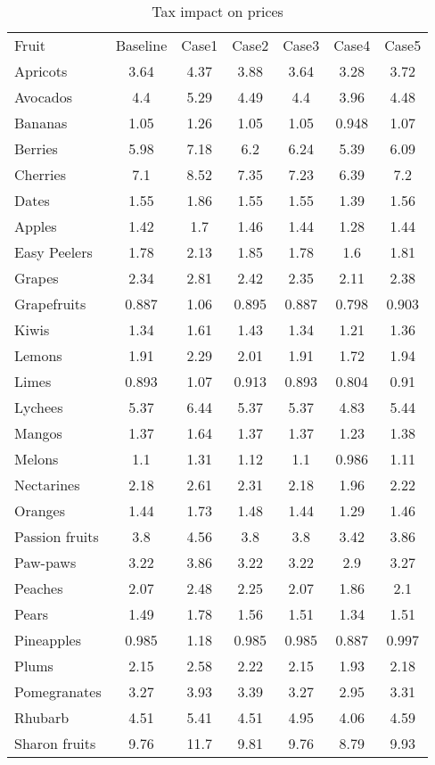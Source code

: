 \documentclass[11pt]{article}
\begin{document}
\begin{table}[h]
\caption{Tax impact on prices}
\label{table:tax impact 2}
\begin{center}
\begin{tabular}{lcccccc} \hline \hline
Fruit & Baseline & Case1 & Case2 & Case3 & Case4 & Case5 \\
Apricots &3.64 &4.37 &3.88 &3.64 &3.28 &3.72 \\
Avocados &4.4 &5.29 &4.49 &4.4 &3.96 &4.48 \\
Bananas &1.05 &1.26 &1.05 &1.05 &0.948 &1.07 \\
Berries &5.98 &7.18 &6.2 &6.24 &5.39 &6.09 \\
Cherries &7.1 &8.52 &7.35 &7.23 &6.39 &7.2 \\
\hline
Dates &1.55 &1.86 &1.55 &1.55 &1.39 &1.56 \\
Apples &1.42 &1.7 &1.46 &1.44 &1.28 &1.44 \\
Easy Peelers &1.78 &2.13 &1.85 &1.78 &1.6 &1.81 \\
Grapes &2.34 &2.81 &2.42 &2.35 &2.11 &2.38 \\
Grapefruits &0.887 &1.06 &0.895 &0.887 &0.798 &0.903 \\
\hline
Kiwis &1.34 &1.61 &1.43 &1.34 &1.21 &1.36 \\
Lemons &1.91 &2.29 &2.01 &1.91 &1.72 &1.94 \\
Limes &0.893 &1.07 &0.913 &0.893 &0.804 &0.91 \\
Lychees &5.37 &6.44 &5.37 &5.37 &4.83 &5.44 \\
Mangos &1.37 &1.64 &1.37 &1.37 &1.23 &1.38 \\
\hline
Melons &1.1 &1.31 &1.12 &1.1 &0.986 &1.11 \\
Nectarines &2.18 &2.61 &2.31 &2.18 &1.96 &2.22 \\
Oranges &1.44 &1.73 &1.48 &1.44 &1.29 &1.46 \\
Passion fruits &3.8 &4.56 &3.8 &3.8 &3.42 &3.86 \\
Paw-paws &3.22 &3.86 &3.22 &3.22 &2.9 &3.27 \\
\hline
Peaches &2.07 &2.48 &2.25 &2.07 &1.86 &2.1 \\
Pears &1.49 &1.78 &1.56 &1.51 &1.34 &1.51 \\
Pineapples &0.985 &1.18 &0.985 &0.985 &0.887 &0.997 \\
Plums &2.15 &2.58 &2.22 &2.15 &1.93 &2.18 \\
Pomegranates &3.27 &3.93 &3.39 &3.27 &2.95 &3.31 \\
\hline
Rhubarb &4.51 &5.41 &4.51 &4.95 &4.06 &4.59 \\
Sharon fruits &9.76 &11.7 &9.81 &9.76 &8.79 &9.93 \\
 \hline \hline
\end{tabular}
\end{center}
\end{table}
\end{document}
